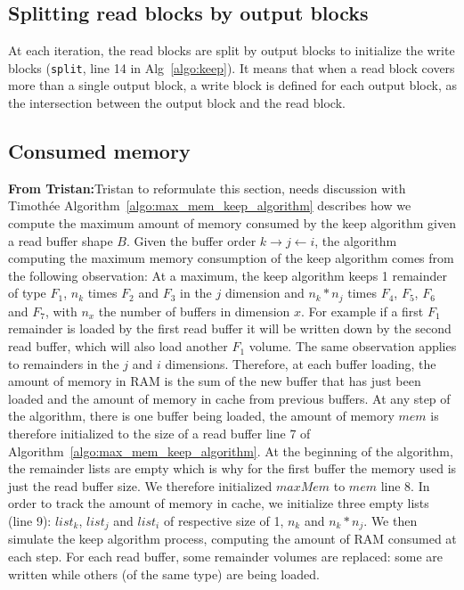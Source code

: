 \documentclass[sigconf, nonacm]{acmart}
\newcommand{\tristan}[1]{\color{orange}\textbf{From Tristan:}#1\color{black}}
\begin{document}
\subsection{Splitting read blocks by output blocks}

At each iteration, the read blocks are split by output blocks to initialize
the write blocks (\texttt{split}, line 14 in Alg~\ref{algo:keep}). It means that when a
read block covers more than a single output block, a write block is defined
for each output block, as the intersection between the output block and the
read block. 

\subsection{Consumed memory}
\tristan{Tristan to reformulate this section, needs discussion with Timothée}
Algorithm~\ref{algo:max_mem_keep_algorithm} describes how we compute the
maximum amount of memory consumed by the keep algorithm given a read buffer shape $B$.
Given the buffer order $k\rightarrow j\leftarrow i$, the algorithm computing
the maximum memory consumption of the keep algorithm comes from the following
observation:
At a maximum, the keep algorithm keeps 1 remainder of type $F_1$,
$n_k$ times $F_2$ and $F_3$ in the $j$ dimension and $n_k*n_j$ times $F_4$, $F_5$,
$F_6$ and $F_7$, with $n_x$ the number of buffers in dimension $x$.
For example if a first $F_1$ remainder is loaded by the first read buffer it
will be written down by the second read buffer, which will also load another $F_1$
volume.
The same observation applies to remainders in the $j$ and $i$ dimensions.
Therefore, at each buffer loading, the amount of memory in RAM is the sum of the
new buffer that has just been loaded and the amount of memory in cache from
previous buffers.
At any step of the algorithm, there is one buffer being loaded, the amount of
memory $mem$ is therefore initialized to the size of a read buffer line 7 of
Algorithm~\ref{algo:max_mem_keep_algorithm}.
At the beginning of the algorithm, the remainder lists are empty which is why
for the first buffer the memory used is just the read buffer size.
We therefore initialized $maxMem$ to $mem$ line 8.
In order to track the amount of memory in cache, we initialize three empty lists
(line 9): $list_k$, $list_j$ and $list_i$ of respective size of 1, $n_k$ and $n_k*n_j$.
We then simulate the keep algorithm process, computing the amount of RAM consumed at
each step.
For each read buffer, some remainder volumes are replaced: some are written
while others (of the same type) are being loaded.
\end{document}
